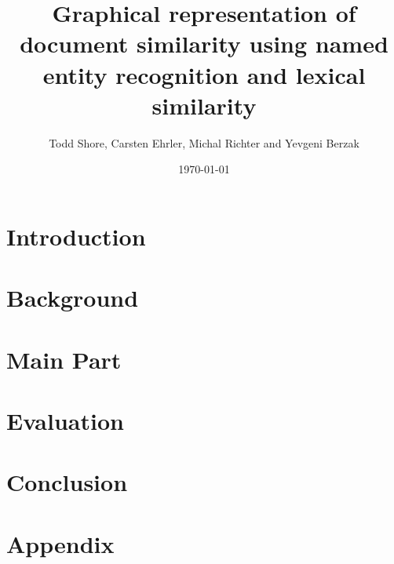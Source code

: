 \documentclass[12pt]{article}
\title{Graphical representation of document similarity using named entity recognition and lexical similarity}
\author{Todd Shore, Carsten Ehrler, Michal Richter and Yevgeni Berzak}
\date{\today}
\begin{document}
\ifpdf
{}
\else
{}
\fi

\maketitle
\tableofcontents

\begin{abstract}
\end{abstract}


\section{Introduction} %
\label{sec:introduction}



\section{Background} %
\label{sec:background}



\section{Main Part}
\label{sec:mainpart}



\section{Evaluation}
\label{sec:evaluation}



\section{Conclusion}
\label{sec:conclusion}



\section{Appendix}



\end{document}
